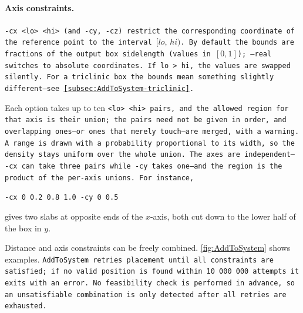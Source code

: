 \paragraph{Axis constraints.}
\tt{-cx <lo> <hi>} (and \tt{-cy}, \tt{-cz}) restrict the corresponding
coordinate of the reference point to the interval $[lo,\,hi)$. By default the
bounds are fractions of the output box sidelength (values in $[0,1]$);
\tt{--real} switches to absolute coordinates. If \tt{lo > hi}, the values are
swapped silently. For a triclinic box the bounds mean something slightly
different---see \cref{subsec:AddToSystem-triclinic}.

Each option takes up to ten \tt{<lo> <hi>} pairs, and the allowed region for
that axis is their union; the pairs need not be given in order, and overlapping
ones---or ones that merely touch---are merged, with a warning. A range is drawn with a probability proportional to its width,
so the density stays uniform over the whole union. The axes are independent---
\tt{-cx} can take three pairs while \tt{-cy} takes one---and the region is the
product of the per-axis unions. For instance,
\begin{center}
  \tt{-cx 0 0.2 0.8 1.0 -cy 0 0.5}
\end{center}
gives two slabs at opposite ends of the $x$-axis, both cut down to the lower
half of the box in $y$.

Distance and axis constraints can be freely combined. \cref{fig:AddToSystem}
shows examples. \tt{AddToSystem} retries placement until all constraints are
satisfied; if no valid position is found within 10\,000\,000 attempts it exits
with an error. No feasibility check is performed in advance, so an
unsatisfiable combination is only detected after all retries are exhausted.


